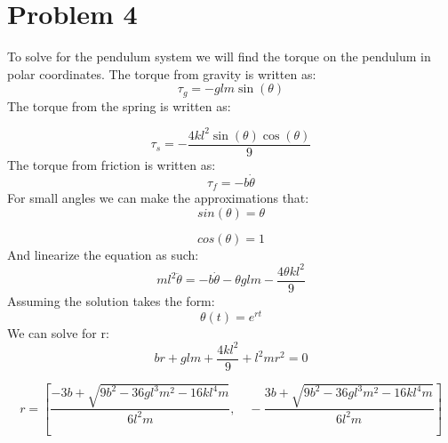 \documentclass{article}
\begin{document}
\section{Problem 4}
To solve for the pendulum system we will find the torque on the pendulum in polar coordinates. The torque from gravity is written as:
\[
\tau _g = - g l m \sin{\left (\theta \right )}\]
The torque from the spring is written as:

\[
\tau_s = - \frac{4 k l^{2} \sin{\left (\theta \right )} \cos{\left (\theta \right )}}{9}
\]
The torque from friction is written as:
\[
\tau_f = -b \dot \theta
\]
For small angles we can make the approximations that:
\[
sin(\theta) = \theta
\]

\[
cos(\theta) = 1
\]
And linearize the equation as such:
\[
ml^2 \ddot \theta  = -b \dot \theta - \theta g l m- \frac{4 \theta k l^{2}}{9}\]
Assuming the solution takes the form:
\[
\theta (t) = e^{rt}
\]
We can solve for r:
\[
b r + g l m + \frac{4 k l^{2}}{9} + l^{2} m r^{2} = 0\]

\[
r =
\left [ \frac{- 3 b + \sqrt{9 b^{2} - 36 g l^{3} m^{2} - 16 k l^{4} m}}{6 l^{2} m}, \quad - \frac{3 b + \sqrt{9 b^{2} - 36 g l^{3} m^{2} - 16 k l^{4} m}}{6 l^{2} m}\right ]\]

%

\end{document}
